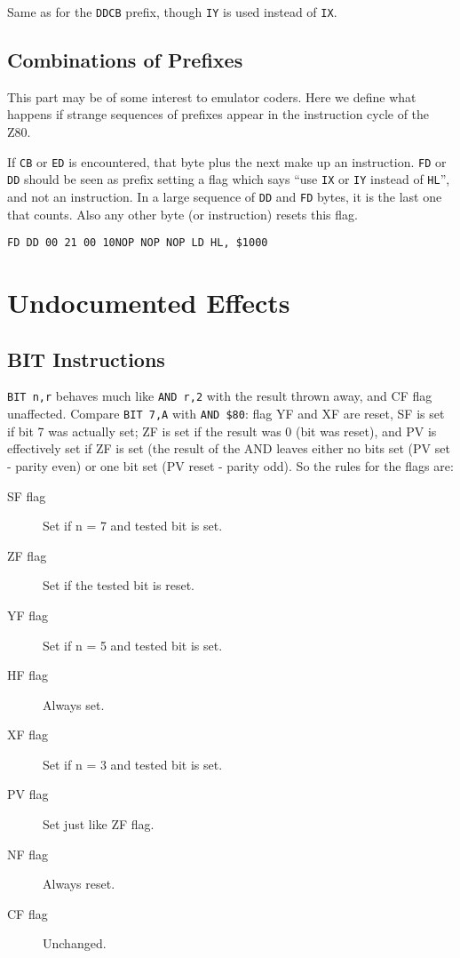 Same as for the {\tt DDCB} prefix, though {\tt IY} is used instead of {\tt IX}.


\subsection{Combinations of Prefixes}

This part may be of some interest to emulator coders. Here we define what happens if strange sequences of prefixes appear in the instruction cycle of the Z80.

If {\tt CB} or {\tt ED} is encountered, that byte plus the next make up an instruction. {\tt FD} or {\tt DD} should be seen as prefix setting a flag which says ``use {\tt IX} or {\tt IY} instead of {\tt HL}'', and not an instruction. In a large sequence of {\tt DD} and {\tt FD} bytes, it is the last one that counts. Also any other byte (or instruction) resets this flag.

{\tt {\qquad}FD DD 00 21 00 10{\qquad}NOP NOP NOP LD HL, \$1000}




\section{Undocumented Effects}

\subsection{BIT Instructions}
\label{bit_flags}

{\tt BIT n,r} behaves much like {\tt AND r,2{\raisebox{1ex}{n}}} with the result thrown away, and CF flag unaffected. Compare {\tt BIT 7,A} with {\tt AND \$80}: flag YF and XF are reset, SF is set if bit 7 was actually set; ZF is set if the result was 0 (bit was reset), and PV is effectively set if ZF is set (the result of the AND leaves either no bits set (PV set - parity even) or one bit set (PV reset - parity odd). So the rules for the flags are:

\begin{description}
	\item[SF flag]
	Set if n = 7 and tested bit is set.

	\item[ZF flag]
	Set if the tested bit is reset.

	\item[YF flag]
	Set if n = 5 and tested bit is set.

	\item[HF flag]
	Always set.

	\item[XF flag]
	Set if n = 3 and tested bit is set.

	\item[PV flag]
	Set just like ZF flag.

	\item[NF flag]
	Always reset. 

	\item[CF flag]
	Unchanged.

\end{description}

